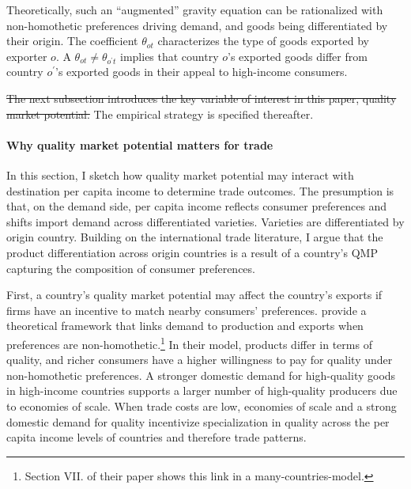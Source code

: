 \documentclass[12pt,a4paper,oneside,times]{article}   	%
\begin{document}
Theoretically, such an ``augmented'' gravity equation can be rationalized with non-homothetic preferences driving demand, and goods being differentiated by their origin. The coefficient $\theta_{ot}$ characterizes the type of goods exported by exporter $o$. A $\theta_{ot} \neq \theta_{o^\prime t}$ implies that country $o$'s exported goods differ from country $o^\prime$'s exported goods in their appeal to high-income consumers. 

\sout{The next subsection introduces the key variable of interest in this paper, quality market potential.} The empirical strategy is specified thereafter.  


\paragraph{Why quality market potential matters for trade}
In this section, I sketch how quality market potential may interact with destination per capita income to determine trade outcomes. The presumption is that, on the demand side, per capita income reflects consumer preferences and shifts import demand across differentiated varieties. Varieties are differentiated by origin country. Building on the international trade literature, I argue that the product differentiation across origin countries is a result of a country's QMP capturing the composition of consumer preferences. %




First, a country's quality market potential may affect the country's exports if firms have an incentive to match nearby consumers' preferences.  \cite{Fajgelbaum2011} provide a theoretical framework that links demand to production and exports when preferences are non-homothetic.\footnote{Section VII. of their paper shows this link in a  many-countries-model.}
 In their model, products differ in terms of quality, and richer consumers have a higher willingness to pay for quality under non-homothetic preferences. 
 A stronger domestic demand for high-quality goods in high-income countries supports a larger number of high-quality producers due to economies of scale. When trade costs are low, economies of scale and a strong domestic demand for quality incentivize specialization in quality across the per capita income levels of countries and therefore trade patterns. 
\end{document}
